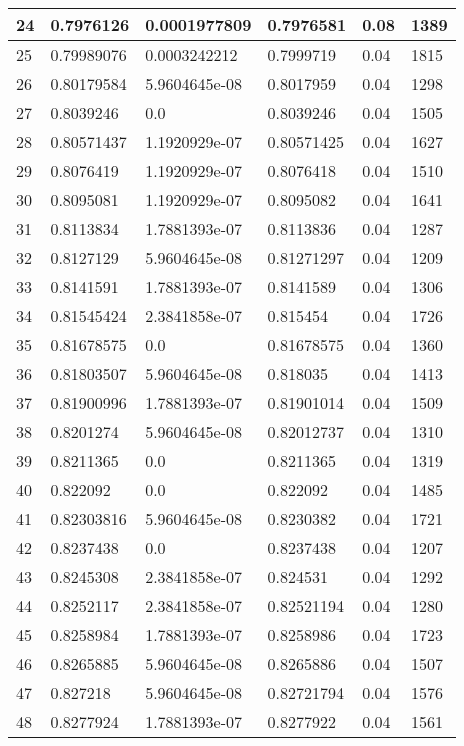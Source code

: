 \begin{longtable}{|l|l|l|l|l|l|}
24 & 0.7976126 & 0.0001977809 & 0.7976581 & 0.08 & 1389 \\ \hline 
25 & 0.79989076 & 0.0003242212 & 0.7999719 & 0.04 & 1815 \\ \hline 
26 & 0.80179584 & 5.9604645e-08 & 0.8017959 & 0.04 & 1298 \\ \hline 
27 & 0.8039246 & 0.0 & 0.8039246 & 0.04 & 1505 \\ \hline 
28 & 0.80571437 & 1.1920929e-07 & 0.80571425 & 0.04 & 1627 \\ \hline 
29 & 0.8076419 & 1.1920929e-07 & 0.8076418 & 0.04 & 1510 \\ \hline 
30 & 0.8095081 & 1.1920929e-07 & 0.8095082 & 0.04 & 1641 \\ \hline 
31 & 0.8113834 & 1.7881393e-07 & 0.8113836 & 0.04 & 1287 \\ \hline 
32 & 0.8127129 & 5.9604645e-08 & 0.81271297 & 0.04 & 1209 \\ \hline 
33 & 0.8141591 & 1.7881393e-07 & 0.8141589 & 0.04 & 1306 \\ \hline 
34 & 0.81545424 & 2.3841858e-07 & 0.815454 & 0.04 & 1726 \\ \hline 
35 & 0.81678575 & 0.0 & 0.81678575 & 0.04 & 1360 \\ \hline 
36 & 0.81803507 & 5.9604645e-08 & 0.818035 & 0.04 & 1413 \\ \hline 
37 & 0.81900996 & 1.7881393e-07 & 0.81901014 & 0.04 & 1509 \\ \hline 
38 & 0.8201274 & 5.9604645e-08 & 0.82012737 & 0.04 & 1310 \\ \hline 
39 & 0.8211365 & 0.0 & 0.8211365 & 0.04 & 1319 \\ \hline 
40 & 0.822092 & 0.0 & 0.822092 & 0.04 & 1485 \\ \hline 
41 & 0.82303816 & 5.9604645e-08 & 0.8230382 & 0.04 & 1721 \\ \hline 
42 & 0.8237438 & 0.0 & 0.8237438 & 0.04 & 1207 \\ \hline 
43 & 0.8245308 & 2.3841858e-07 & 0.824531 & 0.04 & 1292 \\ \hline 
44 & 0.8252117 & 2.3841858e-07 & 0.82521194 & 0.04 & 1280 \\ \hline 
45 & 0.8258984 & 1.7881393e-07 & 0.8258986 & 0.04 & 1723 \\ \hline 
46 & 0.8265885 & 5.9604645e-08 & 0.8265886 & 0.04 & 1507 \\ \hline 
47 & 0.827218 & 5.9604645e-08 & 0.82721794 & 0.04 & 1576 \\ \hline 
48 & 0.8277924 & 1.7881393e-07 & 0.8277922 & 0.04 & 1561 \\ \hline 

\end{longtable}
